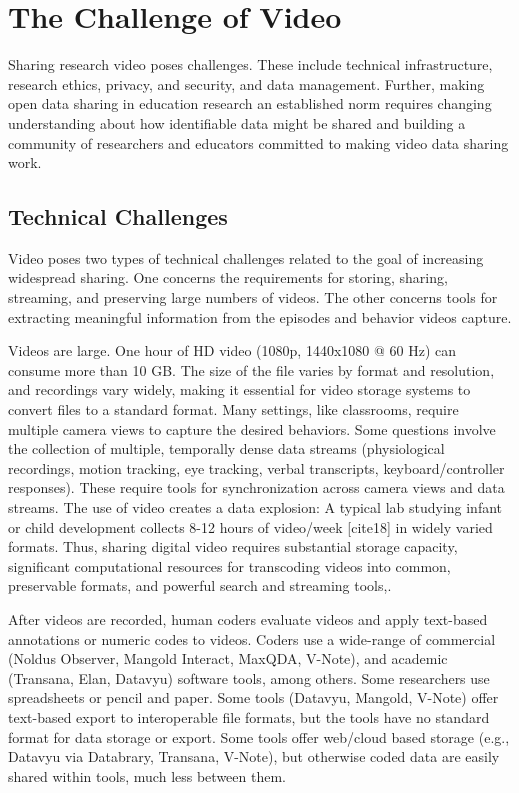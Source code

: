\documentclass[letterpaper,man,natbib]{apa6}
\begin{document}
\section{The Challenge of Video}

Sharing research video poses challenges.
These include technical infrastructure, research ethics, privacy, and security, and data management. 
Further, making open data sharing in education research an established norm requires changing understanding about how identifiable data might be shared and building a community of researchers and educators committed to making video data sharing work.

\subsection{Technical Challenges}

Video poses two types of technical challenges related to the goal of increasing widespread sharing. 
One concerns the requirements for storing, sharing, streaming, and preserving large numbers of videos. 
The other concerns tools for extracting meaningful information from the episodes and behavior videos capture.

Videos are large.
One hour of HD video (1080p, 1440x1080 @ 60 Hz) can consume more than 10 GB.
The size of the file varies by format and resolution, and recordings vary widely, making it essential for video storage systems to convert files to a standard format.
Many settings, like classrooms, require multiple camera views to capture the desired behaviors.
Some questions involve the collection of multiple, temporally dense data streams (physiological recordings, motion tracking, eye tracking, verbal transcripts, keyboard/controller responses).
These require tools for synchronization across camera views and data streams.
The use of video creates a data explosion: A typical lab studying infant or child development collects 8-12 hours of video/week [cite18] in widely varied formats. 
Thus, sharing digital video requires substantial storage capacity, significant computational resources for transcoding videos into common, preservable formats, and powerful search and streaming tools,. 

After videos are recorded, human coders evaluate videos and apply text-based annotations or numeric codes to videos.
Coders use a wide-range of commercial (Noldus Observer, Mangold Interact, MaxQDA, V-Note), and academic (Transana, Elan, Datavyu) software tools, among others.
Some researchers use spreadsheets or pencil and paper.
Some tools (Datavyu, Mangold, V-Note) offer text-based export to interoperable file formats, but the tools have no standard format for data storage or export.
Some tools offer web/cloud based storage (e.g., Datavyu via Databrary, Transana, V-Note), but otherwise coded data are easily shared within tools, much less between them.
\end{document}
